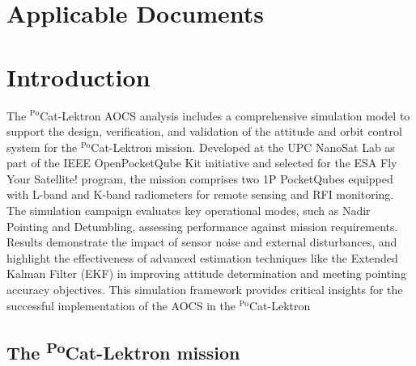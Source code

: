 \section*{Applicable Documents}

\begin{table}[H]
    \centering
\end{table}

\newpage

\section{Introduction}
The $^{\text{Po}}$Cat-Lektron AOCS analysis includes a comprehensive simulation model to support the design,
verification, and validation of the attitude and orbit control system for the $^{\text{Po}}$Cat-Lektron mission. 
Developed at the UPC NanoSat Lab as part of the IEEE OpenPocketQube Kit initiative and selected for the ESA Fly 
Your Satellite! program, the mission comprises two 1P PocketQubes equipped with L-band and K-band radiometers for 
remote sensing and RFI monitoring.\\

\noindent The simulation campaign evaluates key operational modes, such as Nadir Pointing and Detumbling, 
assessing performance against mission requirements. Results demonstrate the impact of sensor noise and external disturbances, 
and highlight the effectiveness of advanced estimation techniques like the Extended Kalman Filter (EKF) in improving attitude 
determination and meeting pointing accuracy objectives. This simulation framework provides critical insights for the successful 
implementation of the AOCS in the $^{\text{Po}}$Cat-Lektron

\subsection{The \texorpdfstring{\textsuperscript{Po}}CCat-Lektron mission}

